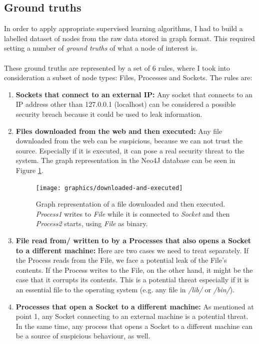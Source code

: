 	\subsection{Ground truths} \label{Section: prep/data/ground-truths}
	In order to apply appropriate supervised learning algorithms, I had to build a labelled dataset of nodes from the raw data stored in graph format. This required setting a number of \textit{ground truths} of what a node of interest is. 
	\\ \\
	These ground truths are represented by a set of 6 rules, where I took into consideration a subset of node types: Files, Processes and Sockets. The rules are:
	\begin{enumerate}
		
		\item \textbf{Sockets that connect to an external IP: }Any socket that connects to an IP address other than 127.0.0.1 (localhost) can be considered a possible security breach because it could be used to leak information.
		
		\item \textbf{Files downloaded from the web and then executed: }Any file downloaded from the web can be suspicious, because we can not trust the source. Especially if it is executed, it can pose a real security threat to the system. The graph representation in the Neo4J database can be seen in Figure \ref{Figure 2.3}.
		\begin{figure}[H]
			\centering
			\texttt{[image: graphics/downloaded-and-executed]}
			\caption[Graph representation of a file downloaded and then executed]{Graph representation of a file downloaded and then executed. \textit{Process1} writes to \textit{File} while it is connected to \textit{Socket} and then \textit{Process2} starts, using \textit{File} as binary.}
			\label{Figure 2.3}
		\end{figure}

		
		\item \textbf{File read from/ written to by a Processes that also opens a Socket to a different machine: }Here are two cases we need to treat separately. If the Process reads from the File, we face a potential leak of the File's contents. If the Process writes to the File, on the other hand, it might be the case that it corrupts its contents. This is a potential threat especially if it is an essential file to the operating system (e.g. any file in \textit{/lib/} or \textit{/bin/}). 
		
		\item \textbf{Processes that open a Socket to a different machine: }As mentioned at point 1, any Socket connecting to an external machine is a potential threat. In the same time, any process that opens a Socket to a different machine can be a source of suspicious behaviour, as well. 
		

\end{enumerate}
